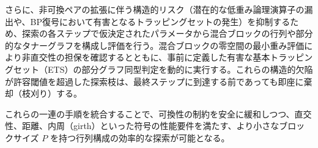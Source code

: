 \documentclass[a4paper,11pt,dvipdfmx]{jsarticle}
\theoremstyle{definition}
\begin{document}
さらに、非可換ペアの拡張に伴う構造的リスク（潜在的な低重み論理演算子の漏出や、BP復号において有害となるトラッピングセットの発生）を抑制するため、探索の各ステップで仮決定されたパラメータから混合ブロックの行列や部分的なタナーグラフを構成し評価を行う。混合ブロックの零空間の最小重み評価により非直交性の担保を確認するとともに、事前に定義した有害な基本トラッピングセット（ETS）の部分グラフ同型判定を動的に実行する。これらの構造的欠陥が許容閾値を超過した探索枝は、最終ステップに到達する前であっても即座に棄却（枝刈り）する。

これらの一連の手順を統合することで、可換性の制約を安全に緩和しつつ、直交性、距離、内周（girth）といった符号の性能要件を満たす、より小さなブロックサイズ $P$ を持つ行列構成の効率的な探索が可能となる。
\end{document}
